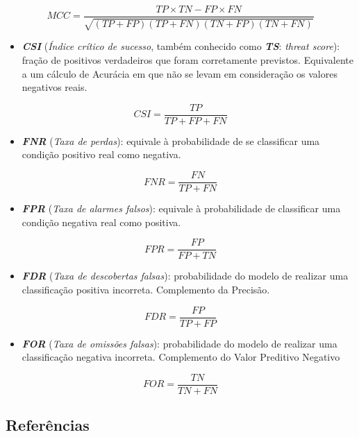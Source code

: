 \documentclass[]{article}
\begin{document}
\[MCC = \frac{TP × TN - FP × FN}{\sqrt{(TP + FP)(TP + FN)(TN + FP)(TN + FN)}}\]

\begin{itemize}
\item
  \textbf{\emph{CSI}} (\emph{Índice crítico de sucesso}, também
  conhecido como \textbf{\emph{TS}}: \emph{threat score}): fração de
  positivos verdadeiros que foram corretamente previstos. Equivalente a
  um cálculo de Acurácia em que não se levam em consideração os valores
  negativos reais.
\end{itemize}

\[CSI = \frac{TP}{TP + FP + FN}\]

\begin{itemize}
\item
  \textbf{\emph{FNR}} (\emph{Taxa de perdas}): equivale à probabilidade
  de se classificar uma condição positivo real como negativa.
\end{itemize}

\[FNR = \frac{FN}{TP + FN}\]

\begin{itemize}
\item
  \textbf{\emph{FPR}} (\emph{Taxa de alarmes falsos}): equivale à
  probabilidade de classificar uma condição negativa real como positiva.
\end{itemize}

\[FPR = \frac{FP}{FP + TN}\]

\begin{itemize}
\item
  \textbf{\emph{FDR}} (\emph{Taxa de descobertas falsas}): probabilidade
  do modelo de realizar uma classificação positiva incorreta.
  Complemento da Precisão.
\end{itemize}

\[FDR = \frac{FP}{TP + FP}\]

\begin{itemize}
\item
  \textbf{\emph{FOR}} (\emph{Taxa de omissões falsas}): probabilidade do
  modelo de realizar uma classificação negativa incorreta. Complemento
  do Valor Preditivo Negativo
\end{itemize}

\[FOR = \frac{TN}{TN + FN}\]

\hypertarget{header-n475}{%
\subsection{Referências}\label{header-n475}}
\end{document}
